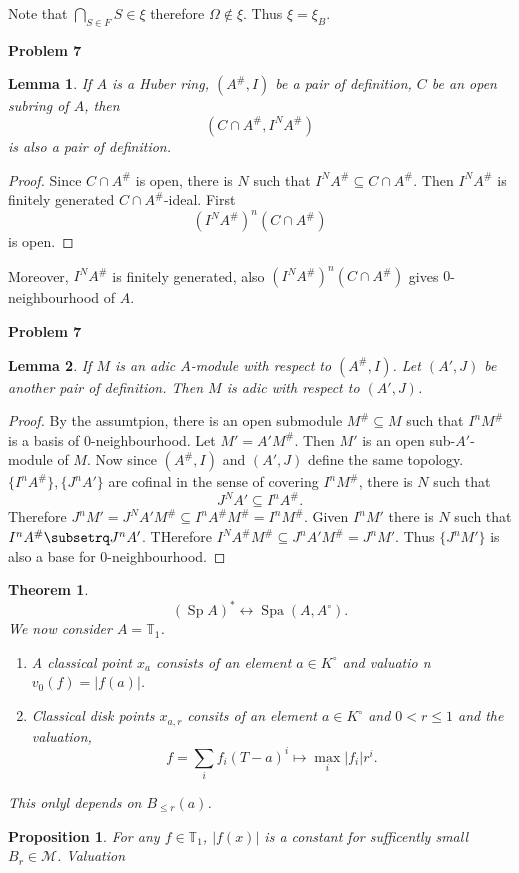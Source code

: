 \documentclass[10pt]{article}
\newtheorem{theorem}{Theorem} [section]
\newtheorem{proposition}{Proposition}[section]
\newtheorem{lemma}{Lemma}[section]
\DeclareMathOperator{\Sp}{Sp}
\DeclareMathOperator{\Spa}{Spa}
\newcommand{\T}[0]{\mathbb{T}}
\newcommand{\ab}[1]{\vert #1 \vert}
\begin{document}
Note that $\bigcap_{S\in F}S\in\xi$ therefore $\Omega\not\in\xi$. Thus $\xi=\xi_B$.
\par\textbf{Problem 7}
\begin{lemma}
    If $A$ is a Huber ring, $(A^\#,I)$ be a pair of definition, $C$ be an open subring of $A$, then 
    \begin{equation*}
        (C\cap A^\#,I^NA^\#)
    \end{equation*}
    is also a pair of definition.
\end{lemma}
\begin{proof}
    Since $C\cap A^\#$ is open, there is $N$ such that $I^N A^\#\subseteq C\cap A^\#$. Then $I^NA^\#$ is finitely generated $C\cap A^\#$-ideal. First 
    \begin{equation*}
        (I^NA^\#)^n(C\cap A^\#)
    \end{equation*}
    is open.
\end{proof}
Moreover, $I^NA^\#$ is finitely generated, also $(I^NA^\#)^n(C\cap A^\#)$ gives $0$-neighbourhood of $A$.
\par\textbf{Problem 7}
\begin{lemma}
    If $M$ is an adic $A$-module with respect to $(A^\#,I)$. Let $(A',J)$ be another pair of definition. Then $M$ is adic with respect to $(A',J)$.
\end{lemma}
\begin{proof}
    By the assumtpion, there is an open submodule $M^\#\subseteq M$ such that $I^n M^\#$ is a basis of $0$-neighbourhood. Let $M'=A'M^\#$. Then $M'$ is an open sub-$A'$-module of $M$. Now since $(A^\#,I)$ and $(A',J)$ define the same topology. $\{I^n A^\#\},\{J^n A'\}$ are cofinal in the sense of covering $I^nM^\#$, there is $N$ such that 
    \begin{equation*}
        J^NA'\subseteq I^nA^\#.
    \end{equation*} 
    Therefore $J^nM' = J^NA'M^\#\subseteq I^nA^\#M^\#=I^nM^\#$. Given $I^nM'$ there is $N$ such that $I^nA^\#\subsetrq J^nA'$.
    THerefore $I^NA^\#M^\#\subseteq J^nA'M^\#=J^nM'$. Thus $\{J^nM'\}$ is also a base for $0$-neighbourhood.
\end{proof}
\begin{theorem}
    \begin{equation*}
        (\Sp A)^\ast\leftrightarrow\Spa(A,A^\circ).
    \end{equation*}
    We now consider $A=\T_1$. 
    \begin{enumerate}
        \item A classical point $x_a$ consists of an element $a\in K^\circ$ and valuatio n$v_0(f) = \ab{f(a)}$.
        \item Classical disk points $x_{a,r}$ consits of an element $a\in K^\circ$ and $0<r\leq 1$ and the valuation,
        \begin{equation}
            f=\sum_{i}f_i(T-a)^i\mapsto \max_{i}\ab{f_i}r^i.
        \end{equation}
    \end{enumerate}
    This onlyl depends on $B_{\leq r}(a)$. 
\end{theorem}
\begin{proposition}
    For any $f\in\T_1$, $\ab{f(x)}$ is a constant for sufficently small $B_{r}\in\mathcal{M}$. Valuation 
\end{proposition}
\end{document}
